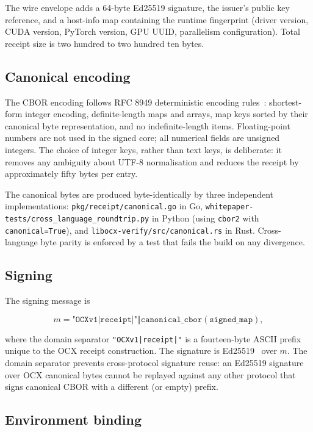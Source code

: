 \documentclass[10pt]{article}
\begin{document}
\noindent The wire envelope adds a 64-byte Ed25519 signature, the issuer's public key reference, and a host-info map containing the runtime fingerprint (driver version, CUDA version, PyTorch version, GPU UUID, parallelism configuration). Total receipt size is two hundred to two hundred ten bytes.

\subsection{Canonical encoding}

The CBOR encoding follows RFC 8949 deterministic encoding rules~\cite{cbor8949}: shortest-form integer encoding, definite-length maps and arrays, map keys sorted by their canonical byte representation, and no indefinite-length items. Floating-point numbers are not used in the signed core; all numerical fields are unsigned integers. The choice of integer keys, rather than text keys, is deliberate: it removes any ambiguity about UTF-8 normalisation and reduces the receipt by approximately fifty bytes per entry.

The canonical bytes are produced byte-identically by three independent implementations: \texttt{pkg/receipt/canonical.go} in Go, \texttt{whitepaper-tests/cross\_language\_roundtrip.py} in Python (using \texttt{cbor2} with \texttt{canonical=True}), and \texttt{libocx-verify/src/canonical.rs} in Rust. Cross-language byte parity is enforced by a test that fails the build on any divergence.

\subsection{Signing}

The signing message is

\begin{equation}
m = \texttt{"OCXv1|receipt|"} \mathbin\Vert \texttt{canonical\_cbor}(\texttt{signed\_map}),
\end{equation}

\noindent where the domain separator \texttt{"OCXv1|receipt|"} is a fourteen-byte ASCII prefix unique to the OCX receipt construction. The signature is Ed25519~\cite{ed25519} over $m$. The domain separator prevents cross-protocol signature reuse: an Ed25519 signature over OCX canonical bytes cannot be replayed against any other protocol that signs canonical CBOR with a different (or empty) prefix.

\subsection{Environment binding}
\end{document}
